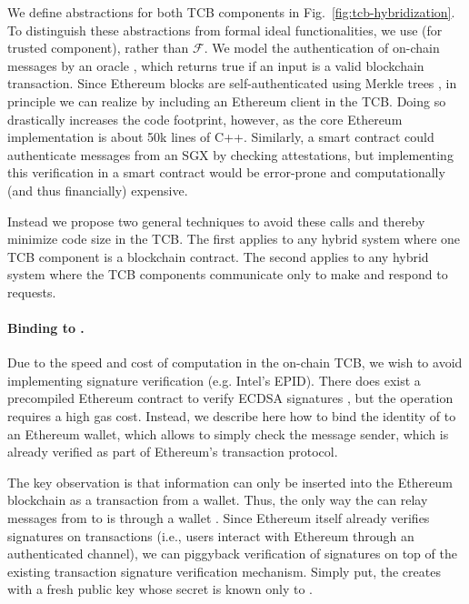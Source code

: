 We define abstractions for both TCB components in Fig.~\ref{fig:tcb-hybridization}.
To distinguish these abstractions from formal ideal functionalities, we use \tcb (for trusted component), rather than $\mathcal{F}$.
We model the authentication of on-chain messages by an oracle \oauth, which returns true if an input is a valid blockchain transaction.
Since Ethereum blocks are self-authenticated using Merkle trees \cite{whitepaper,yellowpaper},
in principle we can realize \oauth by including an Ethereum client in the TCB.
Doing so drastically increases the code footprint, however, as the core Ethereum implementation is about 50k lines of C++.
Similarly, a smart contract could authenticate messages from an SGX by checking attestations,
but implementing this verification in a smart contract would be error-prone and computationally (and thus financially) expensive.

Instead we propose two general techniques to avoid these calls and thereby minimize code size in the TCB.
The first applies to any hybrid system where one TCB component is a blockchain contract.
The second applies to any hybrid system where the TCB components communicate only to make and respond to requests.


\paragraph{Binding \tcboff to \tcadd.}
Due to the speed and cost of computation in the on-chain TCB, we wish to avoid implementing signature verification (e.g. Intel's EPID).
There does exist a precompiled Ethereum contract to verify ECDSA signatures \cite{yellowpaper}, but the operation requires a high gas cost.
Instead, we describe here how to bind the identity of \tcboff to an Ethereum wallet, which allows \tcbon to simply check the message sender,
which is already verified as part of Ethereum's transaction protocol.

The key observation is that information can only be inserted into the Ethereum blockchain as a transaction from a wallet.
Thus, the only way the \medname can relay messages from \tcboff to \tcbon is through a wallet \tcadd.
Since Ethereum itself already verifies signatures on transactions (i.e., users interact with Ethereum through an authenticated channel),
we can piggyback verification of \tcboff signatures on top of the existing transaction signature verification mechanism.
Simply put, the \tcboff creates \tcadd with a fresh public key \pkoff whose secret is known only to \tcboff.

